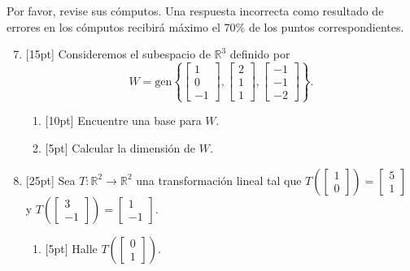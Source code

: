 \documentclass[11pt]{article}
\begin{document}
\vspace{4pt}
\noindent Por favor, revise sus cómputos. Una respuesta incorrecta como resultado de errores en los cómputos recibirá máximo el 70\% de los puntos correspondientes.

\begin{enumerate}
\setcounter{enumi}{6}
\item{}[15pt] Consideremos el subespacio de $\mathbb{R}^3$ definido por
\[
W = \mathrm{gen}\left\{\begin{bmatrix}1\\0\\-1\end{bmatrix},\begin{bmatrix}2\\1\\1\end{bmatrix},\begin{bmatrix}-1\\-1\\-2\end{bmatrix}\right\}.
\]
\begin{enumerate}
\item{}[10pt] Encuentre una base para $W$.

\vspace{6cm}

\item{}[5pt] Calcular la dimensión de $W$.

\vspace{2cm}
\end{enumerate}

\newpage
\item{}[25pt] Sea $T:\mathbb{R}^2\to\mathbb{R}^2$ una transformación lineal tal que $T\left(\begin{bmatrix}1\\0\end{bmatrix}\right)=\begin{bmatrix}5\\1\end{bmatrix}$ y $T\left(\begin{bmatrix}3\\-1\end{bmatrix}\right)=\begin{bmatrix}1\\-1\end{bmatrix}$.
\begin{enumerate}
\item{}[5pt] Halle $T\left(\begin{bmatrix}0\\1\end{bmatrix}\right)$.


\end{enumerate}
\end{enumerate}
\end{document}
